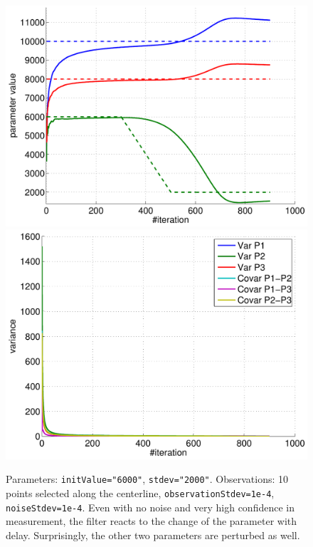 \documentclass[10pt]{article}
\begin{document}
\begin{figure}[h]
\begin{center}
\includegraphics[width=.49\linewidth]{figures/pVar1_estim.pdf}
\hfill
\includegraphics[width=.49\linewidth]{figures/pVar1_var.pdf}
\caption{Parameters: \texttt{initValue="6000"}, \texttt{stdev="2000"}. Observations: 10 points selected along the centerline,
\texttt{observationStdev=1e-4}, \texttt{noiseStdev=1e-4}. Even with no noise and very high confidence in measurement, the filter reacts to the 
change of the parameter with delay. Surprisingly, the other two parameters are perturbed as well.}
\label{fig:Results1}
\end{center}
\end{figure}
\end{document}
